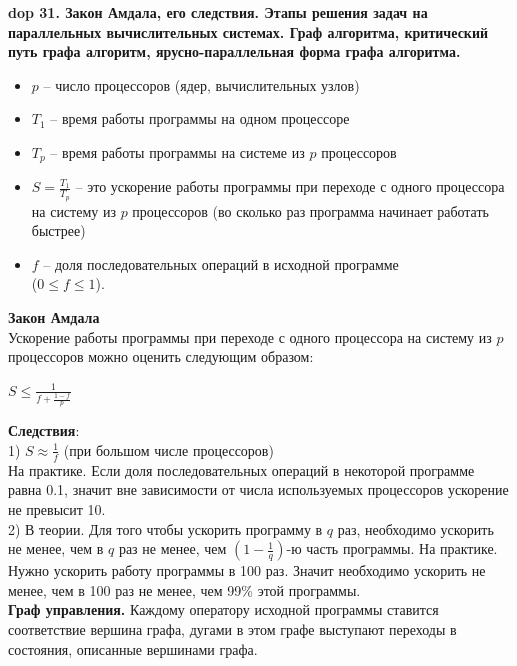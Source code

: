 \setcounter{section}{4}
\setcounter{subsection}{31}
\setcounter{equation}{0}
\textbf{\LARGE dop 31. Закон Амдала, его следствия. Этапы решения задач на параллельных вычислительных системах. Граф алгоритма, критический путь графа алгоритм, ярусно-параллельная форма графа алгоритма.}\\

\begin{itemize}
    \item $p$ – число процессоров (ядер, вычислительных узлов)
    \item $T_{1}$ – время работы программы на одном процессоре
    \item $T_{p}$ – время работы программы на системе из $p$ процессоров
    \item $S = \frac{T_{1}}{T_{p}}$ – это ускорение работы программы при переходе с одного процессора на систему из $p$ процессоров (во сколько раз
программа начинает работать быстрее)
    \item $f$ – доля последовательных операций в исходной программе\\
    ($0 \leq f \leq 1$).
\end{itemize}

\textbf{Закон Амдала}\\
Ускорение работы программы при переходе с одного процессора на систему из $p$ процессоров можно оценить следующим образом:
\begin{center}
$S \leq \frac{1}{f + \frac{1 - f}{p}}$
\end{center}

\textbf{Следствия}:\\
1) $S \approx \frac{1}{f}$ (при большом числе процессоров)\\
На практике. Если доля последовательных операций в некоторой программе равна 0.1, значит вне зависимости от числа используемых процессоров ускорение не превысит 10.\\

2) В теории. Для того чтобы ускорить программу в $q$ раз, необходимо ускорить не менее, чем в $q$ раз не менее, чем $(1-\frac{1}{q})$-ю часть программы.
На практике. Нужно ускорить работу программы в 100 раз. Значит необходимо ускорить не менее, чем в 100 раз не менее, чем 99\% этой программы.\\

\textbf{Граф управления.} Каждому оператору исходной программы ставится соответствие вершина графа, дугами в этом графе выступают переходы в состояния, описанные вершинами графа.\\

